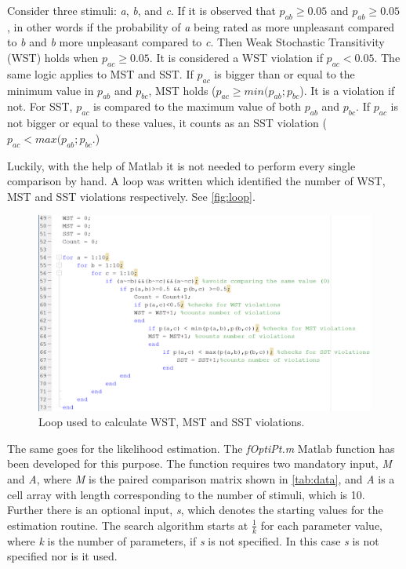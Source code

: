 \noindent
%
Consider three stimuli: \textit{a}, \textit{b}, and \textit{c}. If it is observed that $p_{ab} \geq 0.05$ and $p_{ab} \geq 0.05$, in other words if the probability of \textit{a} being rated as more unpleasant compared to \textit{b} and \textit{b} more unpleasant compared to \textit{c}. Then Weak Stochastic Transitivity (WST) holds when $p_{ac} \geq 0.05$. It is considered a WST violation if $p_{ac} < 0.05$. The same logic applies to MST and SST. If $p_{ac}$ is bigger than or equal to the minimum value in $p_{ab}$ and $p_{bc}$, MST holds ($p_{ac}\geq min(p_{ab};p_{bc}$). It is a violation if not. For SST, $p_{ac}$ is compared to the maximum value of both $p_{ab}$ and $p_{bc}$. If $p_{ac}$ is not bigger or equal to these values, it counts as an SST violation ($p_{ac}< max(p_{ab};p_{bc}$.)

Luckily, with the help of Matlab it is not needed to perform every single comparison by hand. A loop was written which identified the number of WST, MST and SST violations respectively. See \autoref{fig:loop}.
%
\begin{figure}[H]
\centering
\includegraphics[width = \textwidth]{Figure/loop.png} 
\caption{Loop used to calculate WST, MST and SST violations.}
\label{fig:loop}
\end{figure}
\noindent
%
The same goes for the likelihood estimation. The \textit{fOptiPt.m} Matlab function has been developed for this purpose. The function requires two mandatory input, \textit{M} and \textit{A}, where \textit{M} is the paired comparison matrix shown in \autoref{tab:data}, and \textit{A} is a cell array with length corresponding to the number of stimuli, which is 10. Further there is an optional input, \textit{s}, which denotes the starting values for the estimation routine. The search algorithm starts at $\frac{1}{k}$ for each parameter value, where \textit{k} is the number of parameters, if \textit{s} is not specified. In this case \textit{s} is not specified nor is it used.
\vfill